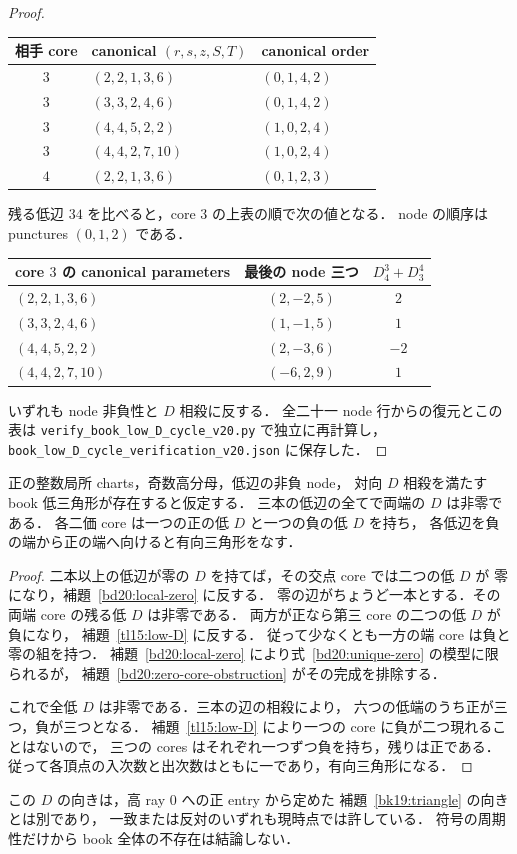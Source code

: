\begin{proof}
\begin{center}
\small
\begin{tabular}{cll}
相手 core & canonical $(r,s,z,S,T)$ & canonical order\\
\hline
$3$ & $(2,2,1,3,6)$ & $(0,1,4,2)$\\
$3$ & $(3,3,2,4,6)$ & $(0,1,4,2)$\\
$3$ & $(4,4,5,2,2)$ & $(1,0,2,4)$\\
$3$ & $(4,4,2,7,10)$ & $(1,0,2,4)$\\
\hline
$4$ & $(2,2,1,3,6)$ & $(0,1,2,3)$\\
\end{tabular}
\end{center}

残る低辺 $34$ を比べると，core $3$ の上表の順で次の値となる．
node の順序は punctures $(0,1,2)$ である．
\begin{center}
\small
\begin{tabular}{lcc}
core $3$ の canonical parameters & 最後の node 三つ & $D^3_4+D^4_3$\\
\hline
$(2,2,1,3,6)$ & $(2,-2,5)$ & $2$\\
$(3,3,2,4,6)$ & $(1,-1,5)$ & $1$\\
$(4,4,5,2,2)$ & $(2,-3,6)$ & $-2$\\
$(4,4,2,7,10)$ & $(-6,2,9)$ & $1$\\
\end{tabular}
\end{center}
いずれも node 非負性と $D$ 相殺に反する．
全二十一 node 行からの復元とこの表は
\nolinkurl{verify_book_low_D_cycle_v20.py} で独立に再計算し，
\nolinkurl{book_low_D_cycle_verification_v20.json} に保存した．
\end{proof}

\begin{theorem}
\label{bd20:nonzero-cycle}
正の整数局所 charts，奇数高分母，低辺の非負 node，
対向 $D$ 相殺を満たす book 低三角形が存在すると仮定する．
三本の低辺の全てで両端の $D$ は非零である．
各二価 core は一つの正の低 $D$ と一つの負の低 $D$ を持ち，
各低辺を負の端から正の端へ向けると有向三角形をなす．
\end{theorem}

\begin{proof}
二本以上の低辺が零の $D$ を持てば，その交点 core では二つの低 $D$ が
零になり，補題~\ref{bd20:local-zero} に反する．
零の辺がちょうど一本とする．その両端 core の残る低 $D$ は非零である．
両方が正なら第三 core の二つの低 $D$ が負になり，
補題~\ref{tl15:low-D} に反する．
従って少なくとも一方の端 core は負と零の組を持つ．
補題~\ref{bd20:local-zero} により式~\eqref{bd20:unique-zero} の模型に限られるが，
補題~\ref{bd20:zero-core-obstruction} がその完成を排除する．

これで全低 $D$ は非零である．三本の辺の相殺により，
六つの低端のうち正が三つ，負が三つとなる．
補題~\ref{tl15:low-D} により一つの core に負が二つ現れることはないので，
三つの cores はそれぞれ一つずつ負を持ち，残りは正である．
従って各頂点の入次数と出次数はともに一であり，有向三角形になる．
\end{proof}

この $D$ の向きは，高 ray $0$ への正 entry から定めた
補題~\ref{bk19:triangle} の向きとは別であり，
一致または反対のいずれも現時点では許している．
符号の周期性だけから book 全体の不存在は結論しない．
